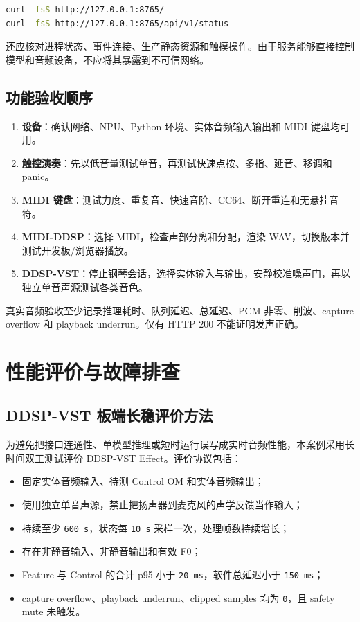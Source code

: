 \begin{lstlisting}[language=bash]
curl -fsS http://127.0.0.1:8765/
curl -fsS http://127.0.0.1:8765/api/v1/status
\end{lstlisting}

还应核对进程状态、事件连接、生产静态资源和触摸操作。由于服务能够直接控制模型和音频设备，不应将其暴露到不可信网络。

\subsection{功能验收顺序}\label{src-experiment-case3-acceptance-order}

\begin{enumerate}
\def\labelenumi{\arabic{enumi}.}
\tightlist
\item
  \textbf{设备}：确认网络、NPU、Python 环境、实体音频输入输出和 MIDI
  键盘均可用。
\item
  \textbf{触控演奏}：先以低音量测试单音，再测试快速点按、多指、延音、移调和
  panic。
\item
  \textbf{MIDI
  键盘}：测试力度、重复音、快速音阶、CC64、断开重连和无悬挂音符。
\item
  \textbf{MIDI-DDSP}：选择 MIDI，检查声部分离和分配，渲染
  WAV，切换版本并测试开发板/浏览器播放。
\item
  \textbf{DDSP-VST}：停止钢琴会话，选择实体输入与输出，安静校准噪声门，再以独立单音声源测试各类音色。
\end{enumerate}

真实音频验收至少记录推理耗时、队列延迟、总延迟、PCM 非零、削波、capture
overflow 和 playback underrun。仅有 HTTP 200 不能证明发声正确。

\section{性能评价与故障排查}\label{src-experiment-case3-results}

\subsection{DDSP-VST
板端长稳评价方法}\label{src-experiment-case3-measured-results}

为避免把接口连通性、单模型推理或短时运行误写成实时音频性能，本案例采用长时间双工测试评价
DDSP-VST Effect。评价协议包括：

\begin{itemize}
\tightlist
\item
  固定实体音频输入、待测 Control OM 和实体音频输出；
\item
  使用独立单音声源，禁止把扬声器到麦克风的声学反馈当作输入；
\item
  持续至少 \passthrough{\lstinline!600 s!}，状态每
  \passthrough{\lstinline!10 s!} 采样一次，处理帧数持续增长；
\item
  存在非静音输入、非静音输出和有效 F0；
\item
  Feature 与 Control 的合计 p95 小于
  \passthrough{\lstinline!20 ms!}，软件总延迟小于
  \passthrough{\lstinline!150 ms!}；
\item
  capture overflow、playback underrun、clipped samples 均为
  \passthrough{\lstinline!0!}，且 safety mute 未触发。
\end{itemize}

